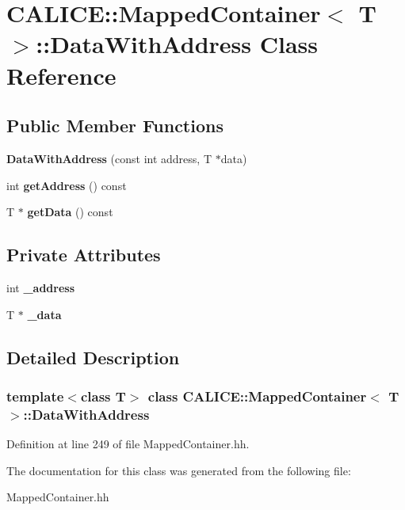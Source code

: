 \section{CALICE::MappedContainer$<$ T $>$::DataWithAddress Class Reference}
\label{classCALICE_1_1MappedContainer_1_1DataWithAddress}
\subsection*{Public Member Functions}
\begin{DoxyCompactItemize}
\item 
{\bfseries DataWithAddress} (const int address, T $\ast$data)\label{classCALICE_1_1MappedContainer_1_1DataWithAddress_ac7e3a4ba88ce83a52f8c8588e6e09f93}

\item 
int {\bfseries getAddress} () const \label{classCALICE_1_1MappedContainer_1_1DataWithAddress_ad2f2af7218488e411b489579955b5abf}

\item 
T $\ast$ {\bfseries getData} () const \label{classCALICE_1_1MappedContainer_1_1DataWithAddress_a9ac16b5083ddc5eb1768db68906583f5}

\end{DoxyCompactItemize}
\subsection*{Private Attributes}
\begin{DoxyCompactItemize}
\item 
int {\bfseries \_\-address}\label{classCALICE_1_1MappedContainer_1_1DataWithAddress_ab31d6a6ecdbf9cbbed05e7ba4d4204cc}

\item 
T $\ast$ {\bfseries \_\-data}\label{classCALICE_1_1MappedContainer_1_1DataWithAddress_a62a77e2b8874fd11ce0c8b065a4e369f}

\end{DoxyCompactItemize}


\subsection{Detailed Description}
\subsubsection*{template$<$class T$>$ class CALICE::MappedContainer$<$ T $>$::DataWithAddress}



Definition at line 249 of file MappedContainer.hh.

The documentation for this class was generated from the following file:\begin{DoxyCompactItemize}
\item 
MappedContainer.hh\end{DoxyCompactItemize}
